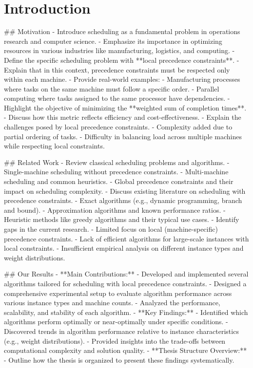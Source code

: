 \chapter{Introduction}

\begin{markdown}
## Motivation
- Introduce scheduling as a fundamental problem in operations research and computer science.
  - Emphasize its importance in optimizing resources in various industries like manufacturing,
    logistics, and computing.
- Define the specific scheduling problem with **local precedence constraints**.
  - Explain that in this context, precedence constraints must be respected only within each
    machine.
  - Provide real-world examples:
    - Manufacturing processes where tasks on the same machine must follow a specific order.
    - Parallel computing where tasks assigned to the same processor have dependencies.
- Highlight the objective of minimizing the **weighted sum of completion times**.
  - Discuss how this metric reflects efficiency and cost-effectiveness.
- Explain the challenges posed by local precedence constraints.
  - Complexity added due to partial ordering of tasks.
  - Difficulty in balancing load across multiple machines while respecting local constraints.

## Related Work
- Review classical scheduling problems and algorithms.
  - Single-machine scheduling without precedence constraints.
  - Multi-machine scheduling and common heuristics.
  - Global precedence constraints and their impact on scheduling complexity.
- Discuss existing literature on scheduling with precedence constraints.
  - Exact algorithms (e.g., dynamic programming, branch and bound).
  - Approximation algorithms and known performance ratios.
  - Heuristic methods like greedy algorithms and their typical use cases.
- Identify gaps in the current research.
  - Limited focus on local (machine-specific) precedence constraints.
  - Lack of efficient algorithms for large-scale instances with local constraints.
  - Insufficient empirical analysis on different instance types and weight distributions.

## Our Results
- **Main Contributions:**
  - Developed and implemented several algorithms tailored for scheduling with local precedence
    constraints.
  - Designed a comprehensive experimental setup to evaluate algorithm performance across
    various
    instance types and machine counts.
  - Analyzed the performance, scalability, and stability of each algorithm.
- **Key Findings:**
  - Identified which algorithms perform optimally or near-optimally under specific conditions.
  - Discovered trends in algorithm performance relative to instance characteristics (e.g.,
    weight
    distributions).
  - Provided insights into the trade-offs between computational complexity and solution
    quality.
- **Thesis Structure Overview:**
  - Outline how the thesis is organized to present these findings systematically.
\end{markdown}
